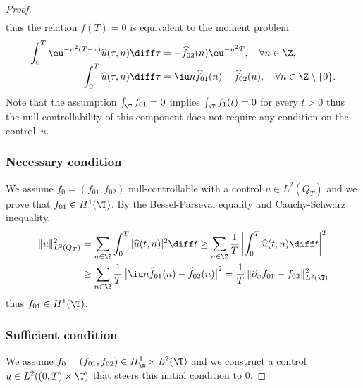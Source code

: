 \begin{proof}
\begin{align*}
\end{align*}
thus the relation $f(T)=0$ is equivalent to the moment problem\vspace*{-3pt}
\begin{equation} \label{moment_pb}
\begin{split}
\int_0^T \eu^{-n^2(T-\tau)}\widehat{u}(\tau,n) \diff \tau&=-\widehat{f}_{02}(n) \eu^{-n^2 T}, \quad \forall n \in \Z, \\[-5pt]
\int_0^T \widehat{u}(\tau,n) \diff \tau &= \iu n \widehat{f}_{01}(n) - \widehat{f}_{02}(n), \quad \forall n \in \Z\setminus\{0\}.
\end{split}
\end{equation}
Note that the assumption $\int_{\T} f_{01} = 0$ implies $\int_{\T} f_1(t) =0$ for every $t>0$ thus the null-controllability of this component does not require any condition on the control~$u$.

\subsubsection*{Necessary condition} We assume $f_0=(f_{01},f_{02})$ null-controllable with a control $u \in L^2(Q_T)$ and we prove that $f_{01} \in H^1(\T)$.
By the Bessel-Parseval equality and Cauchy-Schwarz inequality,
\begin{align*}
\|u\|_{L^2(Q_T)}^2 & = \sum_{n\in\Z}
\int_0^T | \widehat{u}(t,n) |^2 \diff t
\geq \sum_{n\in\Z} \frac{1}{T}\,
\biggl| \int_0^T \widehat{u}(t,n) \diff t \biggr|^2
\\ & \geq
\sum_{n\in\Z} \frac{1}{T}\, \bigl| \iu n \widehat{f}_{01}(n) - \widehat{f}_{02}(n) \bigr|^2 = \frac{1}{T}\, \|\partial_x f_{01} - f_{02}\|_{L^2(\T)}^2
\end{align*}
thus $f_{01} \in H^1(\T)$.

\subsubsection*{Sufficient condition} We assume $f_0=(f_{01},f_{02}) \in H^1_\m \times L^2(\T)$ and we construct a control $u \in L^2((0,T)\times\T)$ that steers this initial condition to $0$.


\end{proof}
